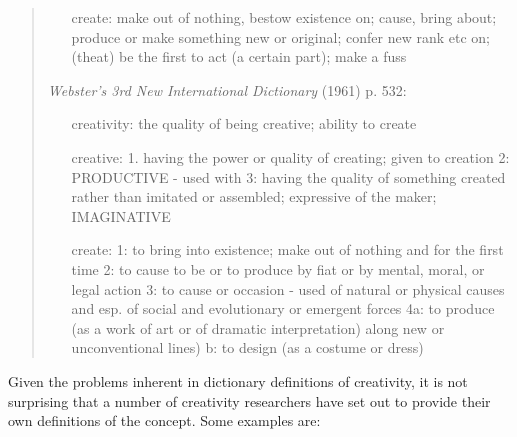 \documentclass[10pt,letterpaper]{article}
\begin{document}
\begin{quotation}
\begin{description}
\begin{enumerate}
	\item [create:] make out of nothing, bestow existence on; cause, bring about; produce or make something new or original; confer new rank etc on; (theat) be the first to act (a certain part); make a fuss
	\end{enumerate}
\item {\em Webster's 3rd New International Dictionary} (1961) p. 532:
	\begin{enumerate}
	\item[creativity:] the quality of being creative; ability to create 
	\item[creative:] 1. having the power or quality of creating; given to creation 2: PRODUCTIVE - used with 3: having the quality of something created rather than imitated or assembled; expressive of the maker; IMAGINATIVE 
	\item[create:] 1: to bring into existence; make out of nothing and for the first time 2: to cause to be or to produce by fiat or by mental, moral, or legal action 3: to cause or occasion - used of natural or physical causes and esp. of social and evolutionary or emergent forces 4a: to produce (as a work of art or of dramatic interpretation) along new or unconventional lines) b: to design (as a costume or dress)
	\end{enumerate}
\end{description}
\end{quotation}

Given the problems inherent in dictionary definitions of creativity, it is not surprising that a number of creativity researchers have set out  to provide their own definitions of the concept.  Some examples are:
\end{document}
